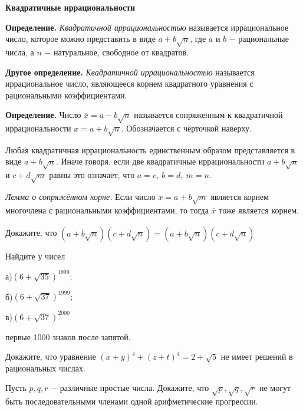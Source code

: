 \hspace{3mm}

\centerline{\bf \Huge Квадратичные иррациональности}

\begin{flushright}
    \scriptsize{}
\end{flushright}

\textbf{Определение.} \textit{Квадратичной иррациональностью} называется иррациональное число, которое можно представить в виде $a+b\sqrt{n}$, где $a$ и $b$ $-$ рациональные числа, а $n$ $-$ натуральное, свободное от квадратов.

\textbf{Другое определение.} \textit{Квадратичной иррациональностью} называется иррациональное число, являющееся корнем квадратного уравнения с рациональными коэффициентами.

\textbf{Определение.} Число $\overline{x} = a - b\sqrt{n}$ называется сопряженным к квадратичной иррациональности $ x = a + b\sqrt{n}.$ Обозначается с чёрточкой наверху.

Любая квадратичная иррациональность единственным образом представляется в виде $a+b\sqrt{n}$. Иначе говоря, если две квадратичные иррациональности $a+b\sqrt{n}$ и $c+d\sqrt{m}$ равны это означает, что $a=c,\ b=d,\ m=n.$

\textit{Лемма о сопряжённом корне.} Если число $x = a+b\sqrt{m}$ является корнем многочлена с рациональными коэффициентами, то тогда $\overline{x}$ тоже является корнем.

Докажите, что $(\overline{a+b\sqrt{n}})(\overline{c+d\sqrt{n}}) = \overline{(a+b\sqrt{n})(c+d\sqrt{n})}$

Найдите у чисел 

а)$(6+\sqrt{35})^{1999};$ 

б)$(6 + \sqrt{37})^{1999};$

в)$(6 + \sqrt{37})^{2000}$

первые 1000 знаков после запятой.

Докажите, что уравнение   $(x+y)^4 + (z+t)^4 = 2 + \sqrt{5}$   не имеет решений в рациональных числах.

Пусть $p, q, r$ $-$ различные простые числа. Докажите, что $\sqrt{p}, \sqrt{q}, \sqrt{r}$ не могут быть последовательными членами одной арифметические прогрессии.